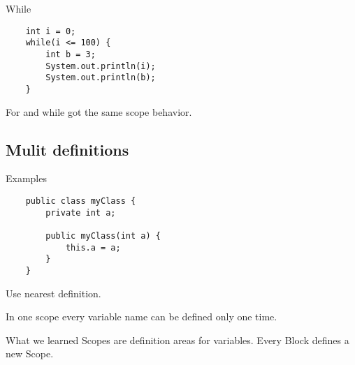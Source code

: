 \begin{frame}[fragile]{While}
	\begin{lstlisting}
	int i = 0;
	while(i <= 100) {
		int b = 3;
		System.out.println(i);
		System.out.println(b);
	}
	\end{lstlisting}
	
	For and while got the same scope behavior.
\end{frame}

\subsection{Mulit definitions}
\begin{frame}[fragile]{Examples}
	\begin{lstlisting}
	public class myClass {
		private int a;
		
		public myClass(int a) {
			this.a = a;
		}
	}
	\end{lstlisting}
	
	Use nearest definition.
	
	In one scope every variable name can be defined only one time.
\end{frame}

\begin{frame}{What we learned}
	Scopes are definition areas for variables.
	Every Block defines a new Scope.
\end{frame}


